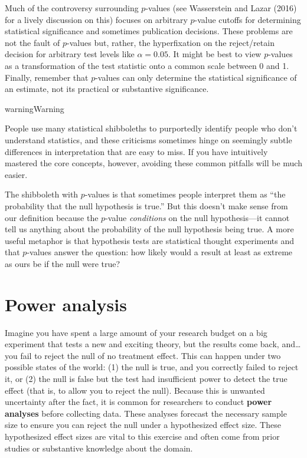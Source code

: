 \documentclass[
  13pt,
  letterpaper,
  DIV=11,
  numbers=noendperiod]{scrreprt}
\theoremstyle{plain}
\theoremstyle{plain}
\theoremstyle{definition}
\theoremstyle{definition}
\theoremstyle{remark}
\begin{document}
Much of the controversy surrounding \(p\)-values (see Wasserstein and
Lazar (2016) for a lively discussion on this) focuses on arbitrary
\(p\)-value cutoffs for determining statistical significance and
sometimes publication decisions. These problems are not the fault of
\(p\)-values but, rather, the hyperfixation on the reject/retain
decision for arbitrary test levels like \(\alpha = 0.05\). It might be
best to view \(p\)-values as a transformation of the test statistic onto
a common scale between 0 and 1. Finally, remember that \(p\)-values can
only determine the statistical significance of an estimate, not its
practical or substantive significance.

\begin{bookcallout}{warning}{Warning}

People use many statistical shibboleths to purportedly identify people
who don't understand statistics, and these criticisms sometimes hinge on
seemingly subtle differences in interpretation that are easy to miss. If
you have intuitively mastered the core concepts, however, avoiding these
common pitfalls will be much easier.

The shibboleth with \(p\)-values is that sometimes people interpret them
as ``the probability that the null hypothesis is true.'' But this
doesn't make sense from our definition because the \(p\)-value
\emph{conditions} on the null hypothesis---it cannot tell us anything
about the probability of the null hypothesis being true. A more useful
metaphor is that hypothesis tests are statistical thought experiments
and that \(p\)-values answer the question: how likely would a result at
least as extreme as ours be if the null were true?

\end{bookcallout}

\section{Power analysis}\label{sec-power-analysis}

Imagine you have spent a large amount of your research budget on a big
experiment that tests a new and exciting theory, but the results come
back, and\ldots{} you fail to reject the null of no treatment effect.
This can happen under two possible states of the world: (1) the null is
true, and you correctly failed to reject it, or (2) the null is false
but the test had insufficient power to detect the true effect (that is,
to allow you to reject the null). Because this is unwanted uncertainty
after the fact, it is common for researchers to conduct \textbf{power
analyses} before collecting data. These analyses forecast the necessary
sample size to ensure you can reject the null under a hypothesized
effect size. These hypothesized effect sizes are vital to this exercise
and often come from prior studies or substantive knowledge about the
domain.
\end{document}
